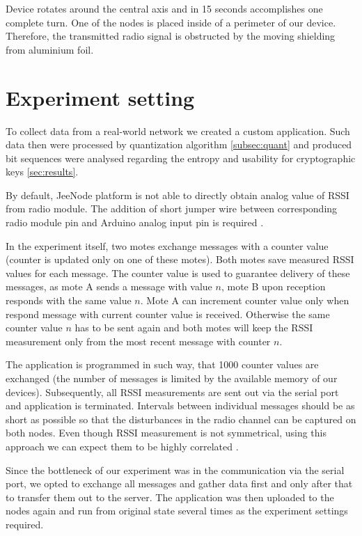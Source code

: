 \documentclass[
  print, %
  Table,   %
  nolof,     %
  nolot,     %
           oneside
]{fithesis3}
\begin{document}
  Device rotates around the central axis and in 15 seconds accomplishes one complete turn. One of the nodes is placed inside of a perimeter of our device. Therefore, the transmitted radio signal is obstructed by the moving shielding from aluminium foil.


  \section{Experiment setting}
   To collect data from a real-world network we created a custom application. Such data then were processed by quantization algorithm \ref{subsec:quant} and produced bit sequences were analysed regarding the entropy and usability for cryptographic keys \ref{sec:results}.

   By default, JeeNode platform is not able to directly obtain analog value of RSSI from radio module. The addition of short jumper wire between corresponding radio module pin and Arduino analog input pin is required \cite{RSSI_RF12B_mod}.

  In the experiment itself, two motes exchange messages with a counter value (counter is updated only on one of these motes). Both motes save measured RSSI values for each message. The counter value is used to guarantee delivery of these messages, as mote A sends a message with value $n$, mote B upon reception responds with the same value $n$. Mote A can increment counter value only when respond message with current counter value is received. Otherwise the same counter value $n$ has to be sent again and both motes will keep the RSSI measurement only from the most recent message with counter $n$.

  The application is programmed in such way, that 1000 counter values are exchanged (the number of messages is limited by the available memory of our devices). Subsequently, all RSSI measurements are sent out via the serial port and application is terminated. Intervals between individual messages should be as short as possible so that the disturbances in the radio channel can be captured on both nodes. Even though RSSI measurement is not symmetrical, using this approach we can expect them to be highly correlated \cite{Jana2009Rssi}.

Since the bottleneck of our experiment was in the communication via the serial port, we opted to exchange all messages and gather data first and only after that to transfer them out to the server. The application was then uploaded to the nodes again and run from original state several times as the experiment settings required.
\end{document}
